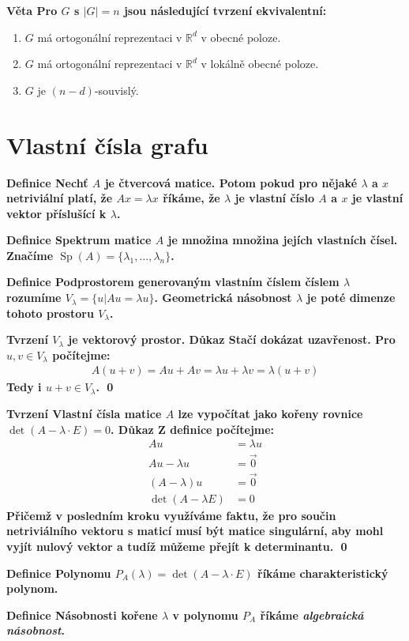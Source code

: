 \documentclass[a4paper,12pt,titlepage]{article}
\newcommand{\dk}{\smallskip\noindent\bf Důkaz\rm{} }
\newcommand{\df}{\smallskip\noindent\bf Definice\rm{} }
\newcommand{\vt}{\smallskip\noindent\bf Věta\rm{} }
\newcommand{\tv}{\smallskip\noindent\bf Tvrzení\rm{} }
\newcommand{\R}{\mathbb{R}}
\DeclareMathOperator{\Sp}{Sp}
\begin{document}
\vt Pro $G$ s $|G| = n$ jsou následující tvrzení ekvivalentní:
\begin{enumerate}
	\item $G$ má ortogonální reprezentaci v $\R^d$ v obecné poloze.
	\item $G$ má ortogonální reprezentaci v $\R^d$ v lokálně obecné poloze.
	\item $G$ je $(n-d)$-souvislý.
\end{enumerate}


\section{Vlastní čísla grafu}
\df Nechť $A$ je čtvercová matice. Potom pokud pro nějaké $\lambda$ a $x$ netriviální platí, že $Ax=\lambda x$ říkáme, že $\lambda$ je vlastní číslo $A$ a $x$ je vlastní vektor příslušící k $\lambda$.

\df Spektrum matice $A$ je množina množina jejích vlastních čísel. Značíme $\Sp(A) = \{ \lambda_1, \ldots, \lambda_n \}$.

\df Podprostorem generovaným vlastním číslem číslem $\lambda$ rozumíme $V_\lambda = \{u | Au = \lambda u \}$. Geometrická násobnost $\lambda$ je poté dimenze tohoto prostoru $V_\lambda$.

\tv $V_\lambda$ je vektorový prostor.
\dk Stačí dokázat uzavřenost. Pro $u,v\in V_\lambda$ počítejme:
\begin{align}
	A(u+v) = Au + Av = \lambda u + \lambda v = \lambda(u+v)
\end{align}
Tedy i $u+v\in V_\lambda$. \qed

\tv Vlastní čísla matice $A$ lze vypočítat jako kořeny rovnice $\det(A - \lambda \cdot E) = 0$.
\dk Z definice počítejme:
\begin{align}
	Au &= \lambda u \\
	Au - \lambda u &= \vec0 \\
	(A-\lambda) u &= \vec0 \\
	\det(A - \lambda E) &= 0 
\end{align}
Přičemž v posledním kroku využíváme faktu, že pro součin netriviálního vektoru s maticí musí být matice singulární, aby mohl vyjít nulový vektor a tudíž můžeme přejít k determinantu. \qed

\df Polynomu $P_A(\lambda) = \det(A - \lambda \cdot E)$ říkáme charakteristický polynom.

\df Násobnosti kořene $\lambda$ v polynomu $P_A$ říkáme {\it algebraická násobnost}.
\end{document}
